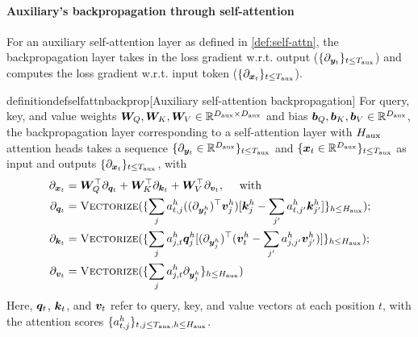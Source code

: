 \paragraph{Auxiliary's backpropagation through self-attention} For an auxiliary self-attention layer as defined in \cref{def:self-attn}, the backpropagation layer takes in the loss gradient w.r.t. output ($\{ \partial_{{\bm{y}}_t} \}_{t \le T_{\text{aux}}}$) and computes the loss gradient  w.r.t. input token ($\{  \partial_{{\bm{x}}_t} \}_{t \le T_{\text{aux}}}$). 

\begin{restatable}{definition}{defselfattnbackprop}[Auxiliary self-attention backpropagation]\label{def:self-attn-backprop}
    For query, key, and value weights ${\bm{W}}_Q, {\bm{W}}_K, {\bm{W}}_V \in\mathbb{R}^{D_{\text{aux}}\times D_{\text{aux}}}$ and bias ${\bm{b}}_{Q}, {\bm{b}}_{K}, {\bm{b}}_{V} \in\mathbb{R}^{D_{\text{aux}}}$, the backpropagation layer corresponding to a self-attention layer with $H_{\text{aux}}$ attention heads takes a sequence $\{ \partial_{ {\bm{y}}_t } \in\mathbb{R}^{D_{\text{aux}}} \}_{t \le T_{\text{aux}}}$ and $ \{  {\bm{x}}_t  \in\mathbb{R}^{D_{\text{aux}}} \}_{t \le T_{\text{aux}}} $ as input and outputs $\{ \partial_{ {\bm{x}}_t }  \}_{t \le T_{\text{aux}}}$, with 
    \begin{align*}
    \partial_{{\bm{x}}_t} &= {\bm{W}}_Q^{\top} \partial_{ {\bm{q}}_t }  + {\bm{W}}_K^{\top} \partial_{ {\bm{k}}_t }    + {\bm{W}}_V^\top \partial_{ {\bm{v}}_t } , \quad \text{ with } 
    \\ \partial_{ {\bm{q}}_t } &=  \textsc{Vectorize}( \{  \sum_j a^h_{t, j} ( (\partial_{{\bm{y}}_t^h})^{\top} {\bm{v}}^{h}_j ) [ {\bm{k}}^h_j - \sum_{j'} a^h_{t, j'} {\bm{k}}^{h}_{j'} ]  \}_{h \le H_{\text{aux}}} ); \\
    \partial_{ {\bm{k}}_t } &=  \textsc{Vectorize}( \{  \sum_j a^h_{j, t} {\bm{q}}^{h}_{j}  [ (\partial_{{\bm{y}}_j^h})^{\top} ({\bm{v}}^{h}_t - \sum_{j'} a^h_{j, j'} {\bm{v}}^{h}_{j'})  ]  \}_{h \le H_{\text{aux}}} ); \\
    \partial_{ {\bm{v}}_t } &= \textsc{Vectorize}(\{ \sum_{j} a^h_{j, t}  \partial_{{\bm{y}}^h_j} \}_{h \le H_{\text{aux}}} ) 
    \end{align*} 
    Here, ${\bm{q}}_t$, ${\bm{k}}_t$, and ${\bm{v}}_t$ refer to query, key, and value vectors at each position $t$, with the attention scores $\{a_{t, j}^h\}_{t, j \le T_{\text{aux}}, h \le H_{\text{aux}}}$. 

\end{restatable}

